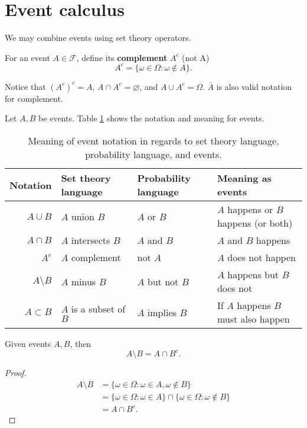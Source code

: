 \section{Event calculus}

We may combine events using set theory operators. 

\begin{definition}
    For an event $A \in \mathcal{F}$, define its \textbf{complement} $A^{c}$ (not A) \[ A^c = \{ \omega \in \Omega : \omega \not \in A \}. \]
\end{definition}

\begin{remark}
    Notice that $(A^c)^c = A$, $A \cap A^c = \varnothing$, and $A \cup A^c = \Omega$. $\bar{A}$ is also valid notation for complement.
\end{remark}

Let $A, B$ be events. Table \ref{tab:event_notation} shows the notation and meaning for events.

\begin{table}
    \centering
    \begin{tabular}{r l l p{8em}}
        \toprule
        Notation & Set theory language & Probability language & Meaning as events \\
        \midrule
        $A \cup B$ & $A$ union $B$ & $A$ or $B$ & $A$ happens or $B$ happens (or both) \\ \addlinespace
        $A \cap B$ & $A$ intersects $B$ & $A$ and $B$ & $A$ and $B$ happens \\ \addlinespace
        $A^c$ & $A$ complement & not $A$ & $A$ does not happen \\ \addlinespace
        $A \setminus B$ & $A$ minus $B$ & $A$ but not $B$ & $A$ happens but $B$ does not \\ \addlinespace
        $A \subset B$ & $A$ is a subset of $B$ & $A$ implies $B$ & If $A$ happens $B$ must also happen \\
        \bottomrule
    \end{tabular}
    \caption{Meaning of event notation in regards to set theory language, probability language, and events.}
    \label{tab:event_notation}
\end{table}

\begin{proposition}
    Given events $A, B$, then \[ A \setminus B = A \cap B^c. \]
\end{proposition}

\begin{proof}
    \begin{align*}
        A \setminus B &= \{ \omega \in \Omega : \omega \in A, \omega \not \in B \} \\
        &= \{ \omega \in \Omega : \omega \in A \} \cap \{ \omega \in \Omega : \omega \not \in B \} \\
        &= A \cap B^c.
    \end{align*}
\end{proof}

